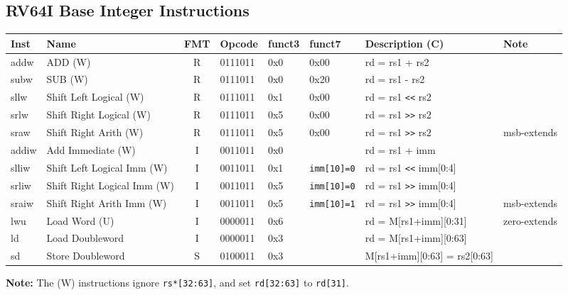 \subsection*{RV64I Base Integer Instructions}
\begin{center}
\begin{tabular}
{T | l | c | T | T | T | T | l} \hline
\rm Inst & Name              & FMT & \rm Opcode & \rm funct3 & \rm funct7 & \rm Description (C) & \rm Note    \\ \hline
addw & ADD (W) & R & 0111011 & 0x0 & 0x00 & rd = rs1 + rs2 & \\
subw & SUB (W) & R & 0111011 & 0x0 & 0x20 & rd = rs1 - rs2 & \\
sllw & Shift Left Logical (W) & R & 0111011 & 0x1 & 0x00 & rd = rs1 \verb~<<~ rs2 & \\
srlw & Shift Right Logical (W) & R & 0111011 & 0x5 & 0x00 & rd = rs1 \verb~>>~ rs2 & \\
sraw & Shift Right Arith (W) & R & 0111011 & 0x5 & 0x00 & rd = rs1 \verb~>>~ rs2 & msb-extends\\
\hline
addiw & Add Immediate (W) & I & 0011011 & 0x0 &  & rd = rs1 + imm & \\
slliw & Shift Left Logical Imm (W) & I & 0011011 & 0x1 & \texttt{imm[10]=0} & rd = rs1 \verb~<<~ imm[0:4] & \\
srliw & Shift Right Logical Imm (W) & I & 0011011 & 0x5 & \texttt{imm[10]=0} & rd = rs1 \verb~>>~ imm[0:4] & \\
sraiw & Shift Right Arith Imm (W) & I & 0011011 & 0x5 & \texttt{imm[10]=1} & rd = rs1 \verb~>>~ imm[0:4] & msb-extends\\
\hline
lwu & Load Word (U) & I & 0000011 & 0x6 &  & rd = M[rs1+imm][0:31] & zero-extends\\
ld & Load Doubleword & I & 0000011 & 0x3 &  & rd = M[rs1+imm][0:63] & \\
\hline
sd & Store Doubleword & S & 0100011 & 0x3 &  & M[rs1+imm][0:63] = rs2[0:63] & \\
\end{tabular}
\end{center}
\textbf{Note:} The (W) instructions ignore \texttt{rs*[32:63]}, and set \texttt{rd[32:63]} to \texttt{rd[31]}.
